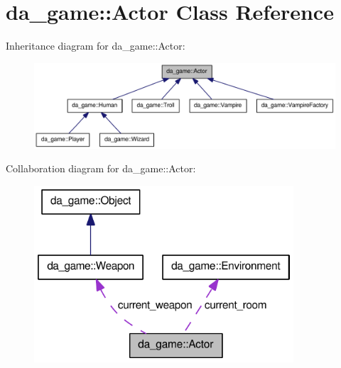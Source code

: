 \hypertarget{classda__game_1_1Actor}{
\section{da\_\-game::Actor Class Reference}
\label{classda__game_1_1Actor}
}
Inheritance diagram for da\_\-game::Actor:\nopagebreak
\begin{figure}[H]
\begin{center}
\leavevmode
\includegraphics[width=400pt]{classda__game_1_1Actor__inherit__graph}
\end{center}
\end{figure}
Collaboration diagram for da\_\-game::Actor:\nopagebreak
\begin{figure}[H]
\begin{center}
\leavevmode
\includegraphics[width=274pt]{classda__game_1_1Actor__coll__graph}
\end{center}
\end{figure}
